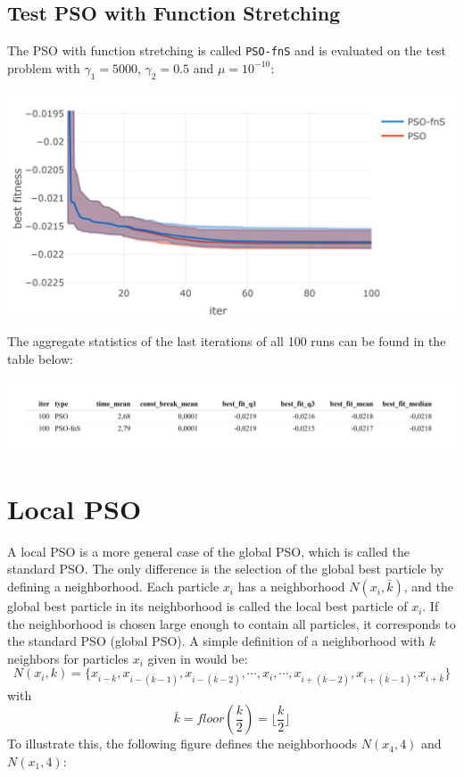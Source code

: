 \documentclass[
  oneside]{book}
\begin{document}
\hypertarget{test-pso-with-function-stretching}{%
\subsection{Test PSO with Function Stretching}\label{test-pso-with-function-stretching}}

The PSO with function stretching is called \texttt{PSO-fnS} and is evaluated on the test problem with \(\gamma_1 = 5000\), \(\gamma_2 = 0.5\) and \(\mu = 10^{-10}\):

\includegraphics{Master_Thesis_files/figure-latex/variants3-1.png}

The aggregate statistics of the last iterations of all 100 runs can be found in the table below:

\includegraphics{Master_Thesis_files/figure-latex/variants4-1.png}

\hypertarget{local-pso}{%
\section{Local PSO}\label{local-pso}}

A local PSO is a more general case of the global PSO, which is called the standard PSO. The only difference is the selection of the global best particle by defining a neighborhood. Each particle \(x_i\) has a neighborhood \(N(x_i, \bar{k})\), and the global best particle in its neighborhood is called the local best particle of \(x_i\). If the neighborhood is chosen large enough to contain all particles, it corresponds to the standard PSO (global PSO). A simple definition of a neighborhood with \(k\) neighbors for particles \(x_i\) given in \citep{Enge2013} would be:
\vspace{-0.1cm}
\[
  N(x_i, k) = \{ x_{i-\bar{k}}, x_{i-(\bar{k}-1)}, x_{i-(\bar{k}-2)}, \cdots, x_{i}, \cdots, x_{i+(\bar{k}-2)}, x_{i+(\bar{k}-1)}, x_{i+\bar{k}} \}
\]
with
\[
  \bar{k} = floor(\frac{k}{2}) = \lfloor \frac{k}{2} \rfloor
\]
To illustrate this, the following figure defines the neighborhoods \(N(x_4, 4)\) and \(N(x_1, 4)\):
\end{document}
